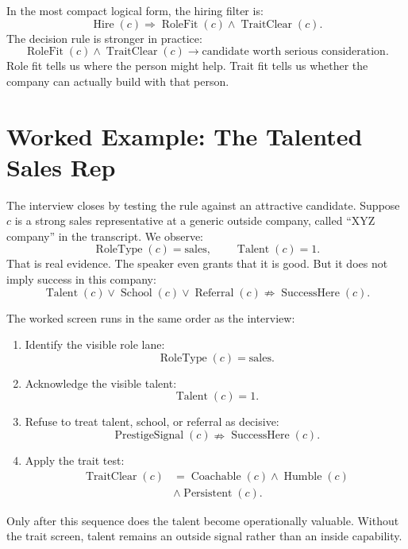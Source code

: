 In the most compact logical form, the hiring filter is:
\begin{equation}
  \operatorname{Hire}(c)
  \Rightarrow
  \operatorname{RoleFit}(c)
  \land
  \operatorname{TraitClear}(c).
\end{equation}
The decision rule is stronger in practice:
\begin{equation}
  \operatorname{RoleFit}(c)
  \land
  \operatorname{TraitClear}(c)
  \longrightarrow
  \text{candidate worth serious consideration}.
\end{equation}
Role fit tells us where the person might help. Trait fit tells us whether the company can actually build with that person.

\section{Worked Example: The Talented Sales Rep}

The interview closes by testing the rule against an attractive candidate. Suppose \(c\) is a strong sales representative at a generic outside company, called ``XYZ company'' in the transcript. We observe:
\begin{equation}
  \operatorname{RoleType}(c)=\text{sales},
  \qquad
  \operatorname{Talent}(c)=1.
\end{equation}
That is real evidence. The speaker even grants that it is good. But it does not imply success in this company:
\begin{equation}
  \operatorname{Talent}(c)
  \lor
  \operatorname{School}(c)
  \lor
  \operatorname{Referral}(c)
  \nRightarrow
  \operatorname{SuccessHere}(c).
\end{equation}

The worked screen runs in the same order as the interview:
\begin{enumerate}
  \item Identify the visible role lane:
  \[
    \operatorname{RoleType}(c)=\text{sales}.
  \]
  \item Acknowledge the visible talent:
  \[
    \operatorname{Talent}(c)=1.
  \]
  \item Refuse to treat talent, school, or referral as decisive:
  \[
    \operatorname{PrestigeSignal}(c)
    \nRightarrow
    \operatorname{SuccessHere}(c).
  \]
  \item Apply the trait test:
  \[
    \begin{aligned}
      \operatorname{TraitClear}(c)
      &=
      \operatorname{Coachable}(c)
      \land
      \operatorname{Humble}(c) \\
      &\land
      \operatorname{Persistent}(c).
    \end{aligned}
  \]
\end{enumerate}
Only after this sequence does the talent become operationally valuable. Without the trait screen, talent remains an outside signal rather than an inside capability.

